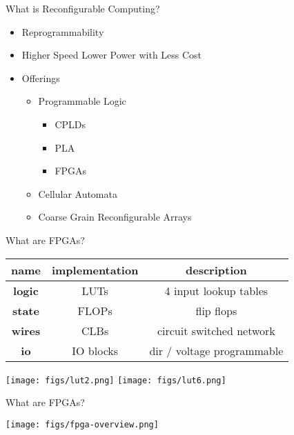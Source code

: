 \begin{frame}[fragile]{What is Reconfigurable Computing?}

\begin{itemize}
\item Reprogrammability
\item Higher Speed Lower Power with Less Cost
\item Offerings
\begin{itemize}
\item Programmable Logic
\begin{itemize}
\item CPLDs
\item PLA
\item FPGAs
\end{itemize}
\item Cellular Automata
\item Coarse Grain Reconfigurable Arrays
\end{itemize}
\end{itemize}

\end{frame}

\begin{frame}[fragile]{What are FPGAs?}

\begin{center}
\begin{tabular}{|c|c|c|}
\hline
{\bf name} & {\bf implementation} & {\bf description} \\
\hline
\hline
{\bf logic} & LUTs & 4 input lookup tables \\
\hline
{\bf state} & FLOPs & flip flops \\
\hline
{\bf wires} & CLBs & circuit switched network \\
\hline
{\bf io} & IO blocks & dir / voltage programmable \\
\hline
\end{tabular}
\end{center}

\begin{center}
\texttt{[image: figs/lut2.png]}
\texttt{[image: figs/lut6.png]}
\end{center}

\end{frame}

\begin{frame}[fragile]{What are FPGAs?}

\begin{center}
\texttt{[image: figs/fpga-overview.png]}
\end{center}

\end{frame}

